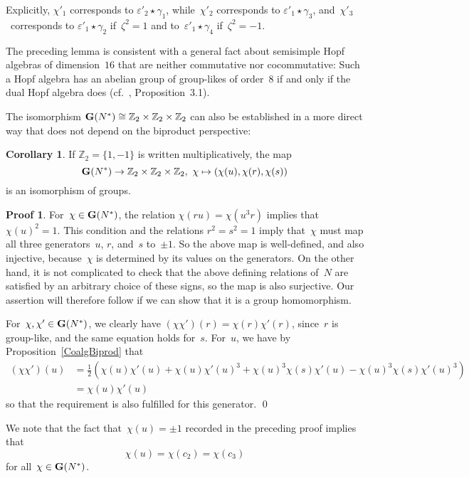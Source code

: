 \documentclass{article}
\numberwithin{equation}{section}
\theoremstyle{definition}
\newtheorem*{cor}{Corollary}
\newtheorem*{pf}{Proof}
\theoremstyle{break}
\newcommand{\K}{1}
\newcommand{\1}{{(1)}}
\newcommand{\2}{{(2)}}
\newcommand{\3}{{(3)}}
\newcommand{\el}{{\varepsilon}}
\newcommand{\Z}{{\mathbb Z}}
\begin{document}
Explicitly, $\chi'_1$ corresponds to $\varepsilon'_2 \star \gamma_1$, while~$\chi'_2$ corresponds to $\varepsilon'_1 \star \gamma_3$, and~$\chi'_3$~corresponds to $\el'_1 \star \gamma_2$ if~$\zeta^2 = 1$ and to~$\el'_1 \star \gamma_4$ if~$\zeta^2 = -1$.

The preceding lemma is consistent with a general fact about semisimple Hopf algebras of dimension~$16$ that are neither commutative nor cocommutative: Such a Hopf algebra has an abelian group of group-likes of order~$8$ if and only if the dual Hopf algebra does (cf.~\cite{Ka}, Proposition~3.1).

The isomorphism ${\bf G}(N^*) \cong \Z_2 \times \Z_2 \times \Z_2$ can also be established in a more direct way that does not depend on the biproduct perspective:
\begin{cor}
If $\Z_2 = \{1,-1\}$ is written multiplicatively, the map
\[{\bf G}(N^*) \to \Z_2 \times \Z_2 \times \Z_2,~\chi \mapsto (\chi(u), \chi(r), \chi(s))\]
is an isomorphism of groups.
\end{cor}
\begin{pf}
For~$\chi \in {\bf G}(N^*)$, the relation $\chi(r u) = \chi(u^3 r)$ implies
that~$\chi(u)^2 = 1$. This condition and the relations
$r^2 = s^2 = 1$ imply that~$\chi$ must map all three generators~$u$, $r$, and~$s$ to~$\pm 1$.
So the above map is well-defined, and also injective, because~$\chi$ is determined by its values on the generators. On the other hand, it is not complicated to check that the above defining relations of~$N$ are satisfied by an arbitrary choice of these signs, so the map is also surjective.  Our assertion will therefore follow if we can show that it is a group homomorphism.

For~$\chi, \chi' \in {\bf G}(N^*)$, we clearly have $(\chi \chi')(r) = \chi(r) \chi'(r)$, since~$r$ is group-like, and the same equation holds for~$s$. For~$u$, we have by Proposition~\ref{CoalgBiprod} that
\begin{align*}
(\chi \chi')(u) &= \frac{\K}{2} \left(\chi(u) \chi'(u) + \chi(u) \chi'(u)^3
+ \chi(u)^3 \chi(s) \chi'(u) - \chi(u)^3 \chi(s) \chi'(u)^3 \right) \\
&= \chi(u) \chi'(u)
\end{align*}
so that the requirement is also fulfilled for this generator.
\qed
\end{pf}

We note that the fact that~$\chi(u) = \pm 1$ recorded in the preceding proof implies that
\[\chi(u) = \chi(c_2) = \chi(c_3)\]
for all~$\chi \in {\bf G}(N^*)$.
\end{document}
